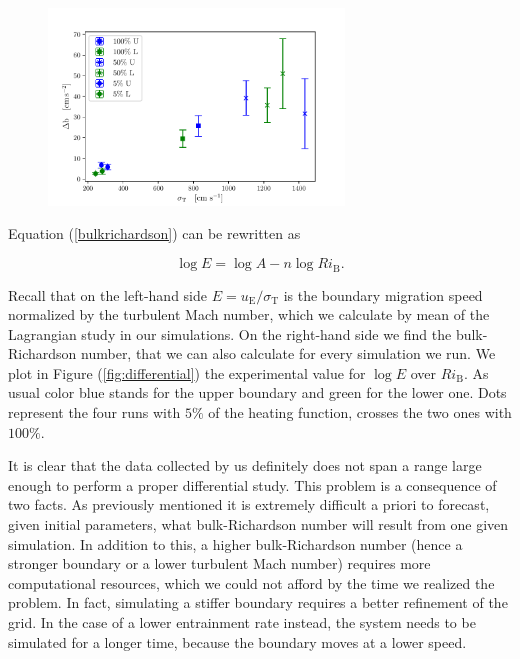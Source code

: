 \begin{figure}[t!]
\centering
\includegraphics[width=0.7\textwidth]{./img/differentialcorr.pdf}
\caption{}
\label{fig:diffcorr}
\centering
\end{figure}


Equation (\ref{bulkrichardson}) can be rewritten as

\begin{equation}\label{eq:logaritmicbulk}
	\log{E} = \log{A} - n \log{Ri_{\mathrm{B}}}.
\end{equation}

Recall that on the left-hand side $E=u_{\mathrm{E}}/\sigma_{\mathrm{T}}$ is the boundary migration speed normalized by the turbulent Mach number, which we calculate by mean of the Lagrangian study in our simulations. On the right-hand side we find the bulk-Richardson number, that we can also calculate for every simulation we run. We plot in Figure (\ref{fig:differential}) the experimental value for $\log E$ over $Ri_{\mathrm{B}}$. As usual color blue stands for the upper boundary and green for the lower one. Dots represent the four runs with $5 \%$ of the heating function, crosses the two ones with $100 \%$.

It is clear that the data collected by us definitely does not span a range large enough to perform a proper differential study. This problem is a consequence of two facts. As previously mentioned it is extremely difficult a priori to forecast, given initial parameters, what bulk-Richardson number will result from one given simulation. In addition to this, a higher bulk-Richardson number (hence a stronger boundary or a lower turbulent Mach number) requires more computational resources, which we could not afford by the time we realized the problem. In fact, simulating a stiffer boundary requires a better refinement of the grid. In the case of a lower entrainment rate instead, the system needs to be simulated for a longer time, because the boundary moves at a lower speed.

